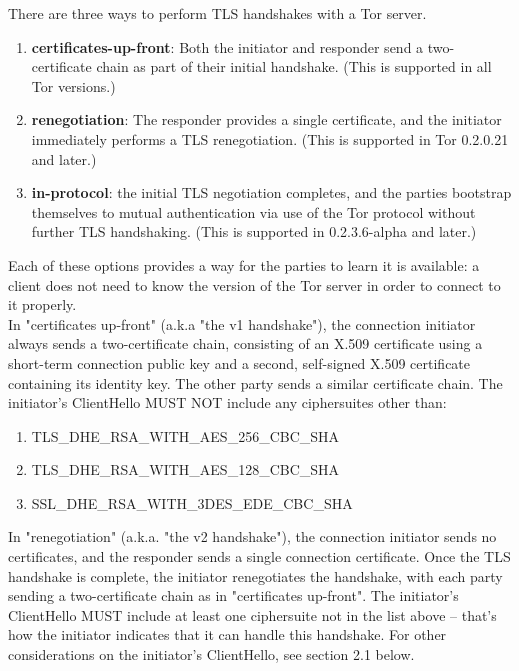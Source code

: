    There are three ways to perform TLS handshakes with a Tor server. 
   
   \begin{enumerate}
	\itemsep0.5em
   	\item \textbf{certificates-up-front}: Both the initiator and responder send a two-certificate chain as part of their initial handshake.  (This is supported in all Tor versions.)
   	\item \textbf{renegotiation}: The responder provides a single certificate, and the initiator immediately performs a TLS renegotiation. (This is supported in Tor 0.2.0.21 and later.)
   	\item \textbf{in-protocol}: the initial TLS negotiation completes, and the parties bootstrap themselves to mutual authentication via use of the Tor protocol without further TLS handshaking. (This is supported in 0.2.3.6-alpha and later.)
   \end{enumerate}
   
Each of these options provides a way for the parties to learn it is
   available: a client does not need to know the version of the Tor
   server in order to connect to it properly.
   \\
   
\label{Key:connection-key} In "certificates up-front" (a.k.a "the v1 handshake"), the connection initiator always sends a two-certificate chain, consisting of an X.509 certificate using a short-term connection public key and a second, self-signed X.509 certificate containing its identity key. The other party sends a similar certificate chain. The initiator's ClientHello MUST NOT include any ciphersuites other than:
\begin{enumerate}
	\item TLS\_DHE\_RSA\_WITH\_AES\_256\_CBC\_SHA
	\item TLS\_DHE\_RSA\_WITH\_AES\_128\_CBC\_SHA
	\item SSL\_DHE\_RSA\_WITH\_3DES\_EDE\_CBC\_SHA
\end{enumerate}

In "renegotiation" (a.k.a. "the v2 handshake"), the connection initiator sends no certificates, and the responder sends a single connection certificate.  Once the TLS handshake is complete, the initiator renegotiates the handshake, with each party sending a two-certificate chain as in "certificates up-front". The initiator's ClientHello MUST include at least one ciphersuite not in the list above -- that's how the initiator indicates that it can handle this handshake.  For other considerations on the initiator's ClientHello, see section 2.1 below.

